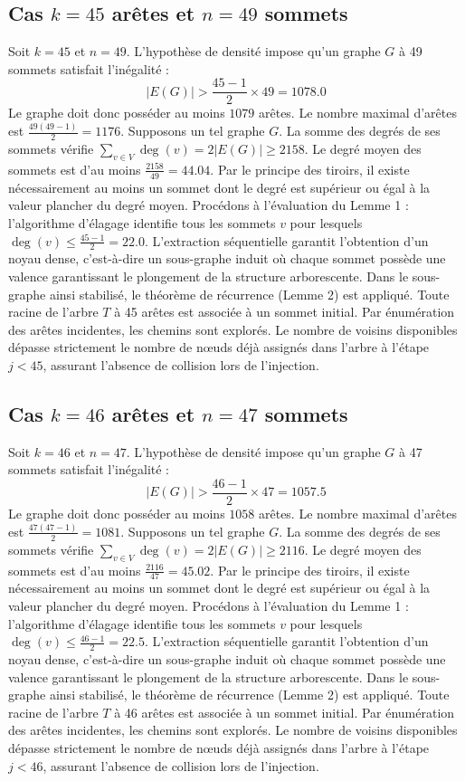 \documentclass[12pt,a4paper]{article}
\begin{document}
\subsection{Cas $k = 45$ arêtes et $n = 49$ sommets}
Soit $k = 45$ et $n = 49$. L'hypothèse de densité impose qu'un graphe $G$ à 49 sommets satisfait l'inégalité :
$$ |E(G)| > \frac{45-1}{2} \times 49 = 1078.0 $$
Le graphe doit donc posséder au moins $1079$ arêtes. Le nombre maximal d'arêtes est $\frac{49(49-1)}{2} = 1176$.
Supposons un tel graphe $G$. La somme des degrés de ses sommets vérifie $\sum_{v \in V} \deg(v) = 2|E(G)| \geq 2158$.
Le degré moyen des sommets est d'au moins $\frac{2158}{49} = 44.04$.
Par le principe des tiroirs, il existe nécessairement au moins un sommet dont le degré est supérieur ou égal à la valeur plancher du degré moyen.
Procédons à l'évaluation du Lemme 1 : l'algorithme d'élagage identifie tous les sommets $v$ pour lesquels $\deg(v) \leq \frac{45-1}{2} = 22.0$.
L'extraction séquentielle garantit l'obtention d'un noyau dense, c'est-à-dire un sous-graphe induit où chaque sommet possède une valence garantissant le plongement de la structure arborescente.
Dans le sous-graphe ainsi stabilisé, le théorème de récurrence (Lemme 2) est appliqué. Toute racine de l'arbre $T$ à 45 arêtes est associée à un sommet initial. Par énumération des arêtes incidentes, les chemins sont explorés. Le nombre de voisins disponibles dépasse strictement le nombre de nœuds déjà assignés dans l'arbre à l'étape $j < 45$, assurant l'absence de collision lors de l'injection.

\subsection{Cas $k = 46$ arêtes et $n = 47$ sommets}
Soit $k = 46$ et $n = 47$. L'hypothèse de densité impose qu'un graphe $G$ à 47 sommets satisfait l'inégalité :
$$ |E(G)| > \frac{46-1}{2} \times 47 = 1057.5 $$
Le graphe doit donc posséder au moins $1058$ arêtes. Le nombre maximal d'arêtes est $\frac{47(47-1)}{2} = 1081$.
Supposons un tel graphe $G$. La somme des degrés de ses sommets vérifie $\sum_{v \in V} \deg(v) = 2|E(G)| \geq 2116$.
Le degré moyen des sommets est d'au moins $\frac{2116}{47} = 45.02$.
Par le principe des tiroirs, il existe nécessairement au moins un sommet dont le degré est supérieur ou égal à la valeur plancher du degré moyen.
Procédons à l'évaluation du Lemme 1 : l'algorithme d'élagage identifie tous les sommets $v$ pour lesquels $\deg(v) \leq \frac{46-1}{2} = 22.5$.
L'extraction séquentielle garantit l'obtention d'un noyau dense, c'est-à-dire un sous-graphe induit où chaque sommet possède une valence garantissant le plongement de la structure arborescente.
Dans le sous-graphe ainsi stabilisé, le théorème de récurrence (Lemme 2) est appliqué. Toute racine de l'arbre $T$ à 46 arêtes est associée à un sommet initial. Par énumération des arêtes incidentes, les chemins sont explorés. Le nombre de voisins disponibles dépasse strictement le nombre de nœuds déjà assignés dans l'arbre à l'étape $j < 46$, assurant l'absence de collision lors de l'injection.
\end{document}
